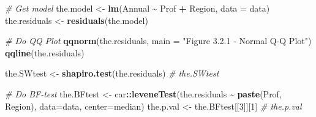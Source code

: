 \documentclass[
]{article}
\newenvironment{Shaded}{\begin{snugshade}}{\end{snugshade}}
\newcommand{\AttributeTok}[1]{\textcolor[rgb]{0.13,0.29,0.53}{#1}}
\newcommand{\CommentTok}[1]{\textcolor[rgb]{0.56,0.35,0.01}{\textit{#1}}}
\newcommand{\DecValTok}[1]{\textcolor[rgb]{0.00,0.00,0.81}{#1}}
\newcommand{\FunctionTok}[1]{\textcolor[rgb]{0.13,0.29,0.53}{\textbf{#1}}}
\newcommand{\NormalTok}[1]{#1}
\newcommand{\OtherTok}[1]{\textcolor[rgb]{0.56,0.35,0.01}{#1}}
\newcommand{\SpecialCharTok}[1]{\textcolor[rgb]{0.81,0.36,0.00}{\textbf{#1}}}
\newcommand{\StringTok}[1]{\textcolor[rgb]{0.31,0.60,0.02}{#1}}
\begin{document}
\begin{Shaded}
\begin{Highlighting}[]
\CommentTok{\# Get model}
\NormalTok{the.model }\OtherTok{\textless{}{-}} \FunctionTok{lm}\NormalTok{(Annual }\SpecialCharTok{\textasciitilde{}}\NormalTok{ Prof }\SpecialCharTok{+}\NormalTok{ Region, }\AttributeTok{data =}\NormalTok{ data)}
\NormalTok{the.residuals }\OtherTok{\textless{}{-}} \FunctionTok{residuals}\NormalTok{(the.model)}
\end{Highlighting}
\end{Shaded}

\begin{Shaded}
\begin{Highlighting}[]
\CommentTok{\# Do QQ Plot}
\FunctionTok{qqnorm}\NormalTok{(the.residuals, }\AttributeTok{main =} \StringTok{"Figure 3.2.1 {-} Normal Q{-}Q Plot"}\NormalTok{)}
\FunctionTok{qqline}\NormalTok{(the.residuals)}
\end{Highlighting}
\end{Shaded}

\begin{Shaded}
\begin{Highlighting}[]
\NormalTok{the.SWtest }\OtherTok{\textless{}{-}} \FunctionTok{shapiro.test}\NormalTok{(the.residuals)}
\CommentTok{\# the.SWtest}
\end{Highlighting}
\end{Shaded}

\begin{Shaded}
\end{Shaded}

\begin{Shaded}
\begin{Highlighting}[]
\CommentTok{\# Do BF{-}test}
\NormalTok{the.BFtest }\OtherTok{\textless{}{-}}\NormalTok{ car}\SpecialCharTok{::}\FunctionTok{leveneTest}\NormalTok{(the.residuals }\SpecialCharTok{\textasciitilde{}} \FunctionTok{paste}\NormalTok{(Prof, Region), }\AttributeTok{data=}\NormalTok{data,}
                              \AttributeTok{center=}\NormalTok{median)}
\NormalTok{the.p.val }\OtherTok{\textless{}{-}}\NormalTok{ the.BFtest[[}\DecValTok{3}\NormalTok{]][}\DecValTok{1}\NormalTok{]}
\CommentTok{\# the.p.val}
\end{Highlighting}
\end{Shaded}
\end{document}
